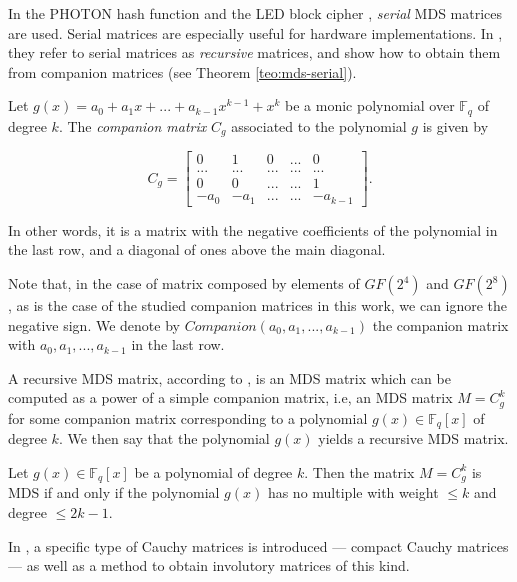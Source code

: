 In the PHOTON hash function \cite{PHOTON2011} and the LED block cipher \cite{LED2012}, \emph{serial} MDS matrices are used. Serial matrices are especially useful for hardware implementations. In \cite{Gupta2016}, they refer to serial matrices as \emph{recursive} matrices, and show how to obtain them from companion matrices (see Theorem \ref{teo:mds-serial}).

\begin{definition}
Let $g(x) = a_0 + a_1x + ... + a_{k-1}x^{k-1} + x^k$ be a monic polynomial over $\mathbb{F}_q$ of degree $k$. The \emph{companion matrix} $C_g$ associated to the polynomial $g$ is given by

$$
C_g =
\begin{bmatrix}
0 & 1 & 0 & ... & 0\\
... & ... & ... & ... & ...\\
0 & 0 & ... & ... & 1\\
-a_0 & -a_1 & ... & ... & -a_{k-1}
\end{bmatrix}.
$$

In other words, it is a matrix with the negative coefficients of the polynomial in the last row, and a diagonal of ones above the main diagonal.
\end{definition}

Note that, in the case of matrix composed by elements of $GF(2^4)$ and $GF(2^8)$, as is the case of the studied companion matrices in this work, we can ignore the negative sign. We denote by $Companion(a_0, a_1, ..., a_{k-1})$ the companion matrix with $a_0, a_1, ..., a_{k-1}$ in the last row.

A recursive MDS matrix, according to \cite{Gupta2016}, is an MDS matrix which can be computed as a power of a simple companion matrix, i.e, an MDS matrix $M = C_g^k$ for some companion matrix corresponding to a polynomial $g(x) \in \mathbb{F}_q[x]$ of degree $k$. We then say that the polynomial $g(x)$ yields a recursive MDS matrix.

\begin{theorem}\label{teo:mds-serial}
Let $g(x) \in \mathbb{F}_q[x]$ be a polynomial of degree $k$. Then the matrix $M = C_g^k$ is MDS if and only if the polynomial $g(x)$ has no multiple with weight $\leq k$ and degree $\leq 2k-1$.
\end{theorem}

In \cite{CuiJin2015}, a specific type of Cauchy matrices is introduced --- compact Cauchy matrices --- as well as a method to obtain involutory matrices of this kind.

